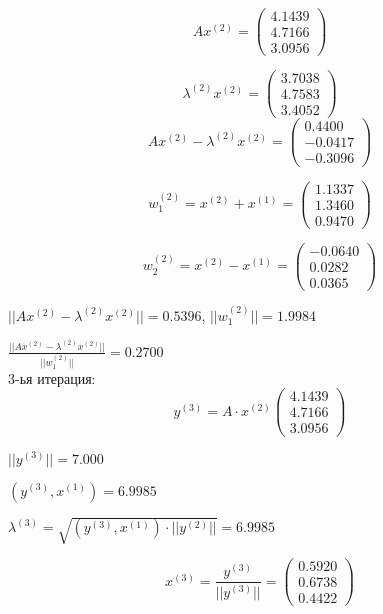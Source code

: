 \documentclass{article}
\begin{document}
	\[Ax^{(2)} =							
	\left(
	\begin{array}{ccc}
		4.1439 \\
		4.7166 \\
		3.0956
	\end{array}
	\right) \]
	
	\[\lambda^{(2)} x^{(2)} =							
	\left(
	\begin{array}{ccc}
		3.7038 \\
		4.7583 \\
		3.4052
	\end{array}
	\right) \]
	\[Ax^{(2)} - \lambda^{(2)} x^{(2)} =							
	\left(
	\begin{array}{ccc}
		0.4400 \\
		-0.0417 \\
		-0.3096
	\end{array}
	\right) \]
	
	\[w^{(2)}_1 = x^{(2)} +  x^{(1)}=							
	\left(
	\begin{array}{ccc}
		1.1337 \\
		1.3460 \\
		0.9470
	\end{array}
	\right) \]
	
	\[w^{(2)}_2 = x^{(2)} -  x^{(1)}=							
	\left(
	\begin{array}{ccc}
		-0.0640 \\
		0.0282 \\
		0.0365
	\end{array}
	\right) \]
	
	$||Ax^{(2)} - \lambda^{(2)} x^{(2)}|| = 0.5396$,
	$||w^{(2)}_1|| = 1.9984$
	
	$\frac{||Ax^{(2)} - \lambda^{(2)} x^{(2)}||}{||w^{(2)}_1||} = 0.2700$	
	~\\
	
	3-ья итерация:
	\[y^{(3)} = A \cdot x^{(2)}							
	\left(
	\begin{array}{ccc}
		4.1439 \\
		4.7166 \\
		3.0956
	\end{array}
	\right) \] 
	
	$||y^{(3)}|| = 7.000$
	
	$({y^{(3)}},{x^{(1)}}) = 6.9985$
	
	$\lambda^{(3)} = \sqrt {{({y^{(3)}},{x^{(1)}})} \cdot ||y^{(2)}||} =  6.9985$
	
	\[x^{(3)} = \frac{y^{(3)}}{||y^{(3)}||} =							
	\left(
	\begin{array}{ccc}
		0.5920 \\
		0.6738 \\
		0.4422
	\end{array}
	\right) \] 
	
\end{document}
